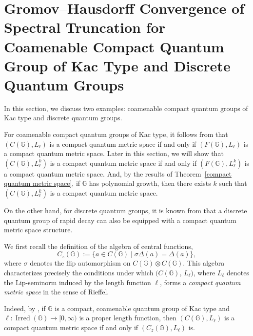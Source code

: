 \documentclass[12pt, reqno]{amsart}
\theoremstyle{definition}
\theoremstyle{remark}
\numberwithin{equation}{section}
\begin{document}
\section{Gromov--Hausdorff Convergence of Spectral Truncation for  
Coamenable Compact Quantum Group of Kac Type and Discrete Quantum Groups}

In this section, we discuss two examples: coamenable compact quantum groups 
of Kac type and discrete quantum groups. 

For coamenable compact quantum groups of Kac type, it follows from \cite{16} 
that $(C(\mathbb{G}), L_\ell)$ is a compact quantum metric space if and only 
if $(F(\mathbb{G}), L_\ell)$ is a compact quantum metric space. Later in this 
section, we will show that $(C(\mathbb{G}), L_\ell^k)$ is a compact quantum 
metric space if and only if $(F(\mathbb{G}), L_\ell^k)$ is a compact quantum 
metric space. And, by the results of Theorem~\ref{compact quantum metric space}, 
if $\mathbb{G}$ has polynomial growth, then there exists $k$ such that $(C(\mathbb{G}), L_\ell^k)$ is a 
compact quantum metric space.

On the other hand, for discrete quantum groups, it is known from \cite{23} 
that a discrete quantum group of rapid decay can also be equipped with a 
compact quantum metric space structure.

We first recall the definition of the algebra of central functions,
\begin{equation}\label{eq:central-functions}
    C_z(\mathbb{G}) := \{a \in C(\mathbb{G}) \mid \sigma\Delta(a) = \Delta(a)\},
\end{equation}
where $\sigma$ denotes the flip automorphism on $C(\mathbb{G})\otimes C(\mathbb{G})$.
This algebra characterizes precisely the conditions under which 
$\bigl(C(\mathbb{G}),\, L_\ell \bigr)$, where $L_\ell$ denotes the Lip-seminorm 
induced by the length function $\ell$, forms a \emph{compact quantum metric space} 
in the sense of Rieffel.

Indeed, by \cite[Theorem~A]{16}, if $\mathbb{G}$ is a compact, coamenable 
quantum group of Kac type and $\ell:\operatorname{Irred}(\mathbb{G})\to[0,\infty)$ 
is a proper length function, then $(C(\mathbb{G}),L_\ell)$ is a compact quantum 
metric space if and only if $(C_z(\mathbb{G}),L_\ell)$ is.
\end{document}
